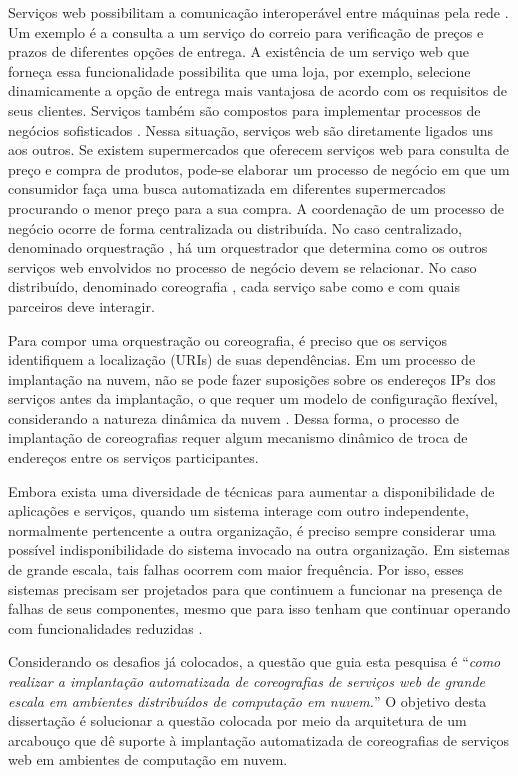 Serviços web possibilitam a comunicação interoperável entre máquinas pela rede \cite{W3C2004WS}. Um exemplo é a consulta a um serviço do correio para verificação de preços e prazos de diferentes opções de entrega. A existência de um serviço web que forneça essa funcionalidade possibilita que uma loja, por exemplo, selecione dinamicamente a opção de entrega mais vantajosa de acordo com os requisitos de seus clientes. Serviços também são compostos para implementar processos de negócios sofisticados \cite{Papazoglou2007State}. Nessa situação, serviços web são diretamente ligados uns aos outros. Se existem supermercados que oferecem serviços web para consulta de preço e compra de produtos, pode-se elaborar um processo de negócio em que um consumidor faça uma busca automatizada em diferentes supermercados procurando o menor preço para a sua compra. A coordenação de um processo de negócio ocorre de forma centralizada ou distribuída. No caso centralizado, denominado orquestração \cite{Nanda2004Decentralizing}, há um orquestrador que determina como os outros serviços web envolvidos no processo de negócio devem se relacionar. No caso distribuído, denominado coreografia \cite{Barker2009Choreographing}, cada serviço sabe como e com quais parceiros deve interagir. 

Para compor uma orquestração ou coreografia, é preciso que os serviços identifiquem a localização (URIs) de suas dependências. Em um processo de implantação na nuvem, não se pode fazer suposições sobre os endereços IPs dos serviços antes da implantação, o que requer um modelo de configuração flexível, considerando a natureza dinâmica da nuvem \cite{Amazon2012Practices}. Dessa forma, o processo de implantação de coreografias requer algum mecanismo dinâmico de troca de endereços entre os serviços participantes. 

Embora exista uma diversidade de técnicas para aumentar a disponibilidade de aplicações e serviços, quando um sistema interage com outro independente, normalmente pertencente a outra organização, é preciso sempre considerar uma possível indisponibilidade do sistema invocado na outra organização. Em sistemas de grande escala, tais falhas ocorrem com maior frequência. Por isso, esses sistemas precisam ser projetados para que continuem a funcionar na presença de falhas de seus componentes, mesmo que para isso tenham que continuar operando com funcionalidades reduzidas \cite{Hamilton2007InternetScale,  Helland2009Quicksand}.

Considerando os desafios já colocados, a questão que guia esta pesquisa é ``\emph{como realizar a implantação automatizada de coreografias de serviços web de grande escala em ambientes distribuídos de computação em nuvem.}'' O objetivo desta dissertação é solucionar a questão colocada por meio da arquitetura de um arcabouço que dê suporte à implantação automatizada de coreografias de serviços web em ambientes de computação em nuvem. 

